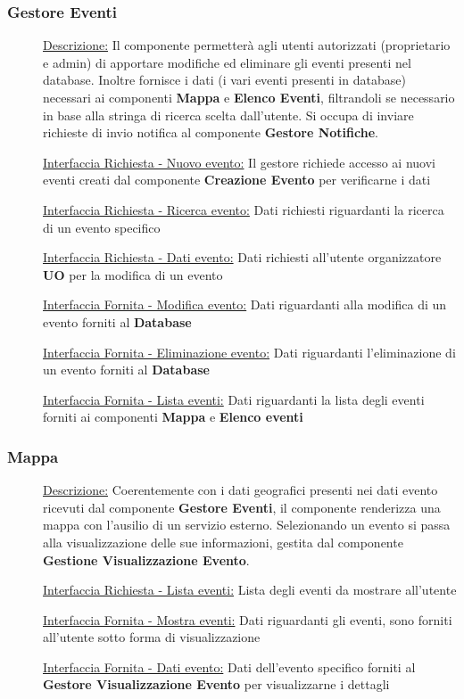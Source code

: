 \documentclass{article}
\begin{document}
\subsubsection{Gestore Eventi}
\begin{description}
    \item[] \underline{Descrizione:} Il componente permetterà agli utenti autorizzati (proprietario e admin) di apportare modifiche ed eliminare gli eventi presenti nel database. Inoltre fornisce i dati (i vari eventi presenti in database) necessari ai componenti \textbf{Mappa} e \textbf{Elenco Eventi}, filtrandoli se necessario in base alla stringa di ricerca scelta dall'utente. Si occupa di inviare richieste di invio notifica al componente \textbf{Gestore Notifiche}.
    \item[] \underline{Interfaccia Richiesta - Nuovo evento:} Il gestore richiede accesso ai nuovi eventi creati dal componente \textbf{Creazione Evento} per verificarne i dati
    \item[] \underline{Interfaccia Richiesta - Ricerca evento:} Dati richiesti riguardanti la ricerca di un evento specifico
    \item[] \underline{Interfaccia Richiesta - Dati evento:} Dati richiesti all'utente organizzatore \textbf{UO} per la modifica di un evento
    \item[] \underline{Interfaccia Fornita - Modifica evento:} Dati riguardanti alla modifica di un evento forniti al \textbf{Database}
    \item[] \underline{Interfaccia Fornita - Eliminazione evento:} Dati riguardanti l'eliminazione di un evento forniti al \textbf{Database}
    \item[] \underline{Interfaccia Fornita - Lista eventi:} Dati riguardanti la lista degli eventi forniti ai componenti \textbf{Mappa} e \textbf{Elenco eventi}
\end{description}
\subsubsection{Mappa}
\begin{description}
    \item[] \underline{Descrizione:} Coerentemente con i dati geografici presenti nei dati evento ricevuti dal componente \textbf{Gestore Eventi}, il componente renderizza una mappa con l'ausilio di un servizio esterno. Selezionando un evento si passa alla visualizzazione delle sue informazioni, gestita dal componente \textbf{Gestione Visualizzazione Evento}.
    \item[] \underline{Interfaccia Richiesta - Lista eventi:} Lista degli eventi da mostrare all'utente
    \item[] \underline{Interfaccia Fornita - Mostra eventi:} Dati riguardanti gli eventi, sono forniti all'utente sotto forma di visualizzazione
    \item[] \underline{Interfaccia Fornita - Dati evento:} Dati dell'evento specifico forniti al \textbf{Gestore Visualizzazione Evento} per visualizzarne i dettagli
\end{description}
\end{document}
